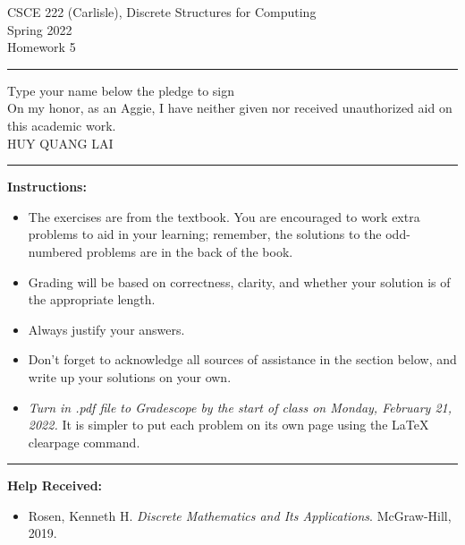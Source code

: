 \documentclass[12pt]{article}  %
\begin{document}
\begin{center}         %
{\large                %
CSCE 222 (Carlisle), Discrete Structures for Computing \\  %
Spring 2022 \\
Homework 5}
\end{center}
\rule{6in}{.1pt}       %
\begin{center}
{\large
Type your name below the pledge to sign\\
On my honor, as an Aggie, I have neither given nor received unauthorized aid on this academic work.\\
HUY QUANG LAI}
\end{center}


\rule{6in}{.1pt}       %
                    
\noindent              %
{\bf Instructions:}    %

\begin{itemize}        %
\item The exercises are from the textbook.  You are encouraged to work
      extra problems to aid in your learning; remember, the solutions to 
      the odd-numbered problems are in the back of the book.
\item Grading will be based on correctness, clarity, and whether your
      solution is of the appropriate length.
\item Always justify your answers.
\item Don't forget to acknowledge all sources of assistance in the section below, and write up your solutions on your own.
\item {\em Turn in .pdf file to Gradescope by the start of class on Monday, February 21, 2022.}  It is simpler to put each problem on its own page using the LaTeX clearpage command.
\end{itemize}


\rule{6in}{.1pt}       %

{\bf Help Received:}    %
\begin{itemize}
\item Rosen, Kenneth H. \emph{Discrete Mathematics and Its Applications}. McGraw-Hill, 2019.
\end{itemize}
\end{document}
